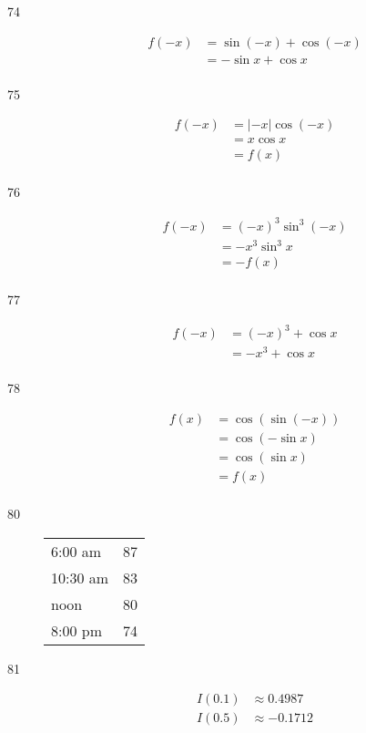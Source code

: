 \documentclass{exam}
\begin{document}
\begin{description}

      \item[74]
        \begin{align*}
          f(-x) & = \sin (-x) + \cos (-x) \\
                & = - \sin x + \cos x \\
        \end{align*}


      \item[75]
        \begin{align*}
          f(-x) & = | -x | \cos (-x) \\
                & = x \cos x \\
                & = f(x) \\
        \end{align*}

      \item[76]
        \begin{align*}
          f(-x) & = (-x)^3 \sin^3 (-x) \\
                & = - x^3 \sin^3 x \\
                & = - f(x) \\
        \end{align*}

      \item[77]
        \begin{align*}
          f(-x) & = (-x)^3 + \cos x \\
                & = - x^3 + \cos x \\
        \end{align*}

      \item[78]
        \begin{align*}
          f(x) & = \cos (\sin (-x)) \\
               & = \cos (- \sin x) \\
               & = \cos (\sin x) \\
               & = f(x) \\
        \end{align*}

      \item[80]
        \begin{tabular}[H]{lr}
          \toprule
          6:00 am  & 87 \\
          10:30 am & 83 \\
          noon     & 80 \\
          8:00 pm  & 74 \\
          \bottomrule
        \end{tabular}

      \item[81]
        \begin{align*}
          I(0.1) & \approx \boxed{ 0.4987 } \\
          I(0.5) & \approx \boxed{ -0.1712 } \\
        \end{align*}
    \end{description}
\end{document}
